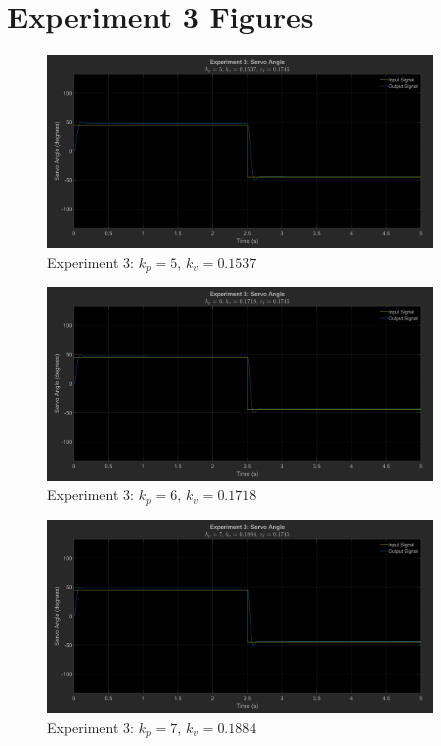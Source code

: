\documentclass[12pt]{article}
\begin{document}
\section{Experiment 3 Figures} \label{appendix:exp3fig}
\begin{figure}[h]
    \centering
    \includegraphics[width=0.91\textwidth]{exp3_kp5_kv0.1537}
    \caption{Experiment 3: $k_p = 5$, $k_v = 0.1537$}
\end{figure}
\begin{figure}[h]
    \centering
    \includegraphics[width=0.91\textwidth]{exp3_kp6_kv0.1718}
    \caption{Experiment 3: $k_p = 6$, $k_v = 0.1718$}
\end{figure}
\begin{figure}[t!]
    \centering
    \includegraphics[width=0.91\textwidth]{exp3_kp7_kv0.1884}
    \caption{Experiment 3: $k_p = 7$, $k_v = 0.1884$}
\end{figure}
\end{document}
